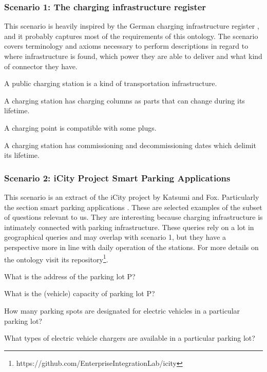 \subsubsection*{Scenario 1: The charging infrastructure register}

This scenario is heavily inspired by the German charging infrastructure
register \cite{Bundesnetzagentur.27Oct2023}, and it probably captures most of
the requirements of this ontology. The scenario covers terminology and axioms
necessary to perform descriptions in regard to where infrastructure is found,
which power they are able to deliver and what kind of connector they have.

\begin{namedbreak}
    A public charging station is a kind of transportation infrastructure.
\end{namedbreak}
\begin{namedbreak}\label{CQ1.1}
    A charging station has charging columns as parts that can change during its lifetime.
\end{namedbreak}
\begin{namedbreak}
    A charging point is compatible with some plugs.
\end{namedbreak}
\begin{namedbreak}
    A charging station has commissioning and decommissioning dates which delimit its lifetime.
\end{namedbreak}

\subsubsection*{Scenario 2: iCity Project Smart Parking Applications}

This scenario is an extract of the iCity project by Katsumi and Fox.
Particularly the section smart parking applications \cite{Katsumi.2020}. These
are selected examples of the subset of questions relevant to us. They are
interesting because charging infrastructure is intimately connected with
parking infrastructure. These queries rely on a lot in geographical queries and
may overlap with scenario 1, but they have a perspective more in line with
daily operation of the stations. For more details on the ontology visit its
repository\footnote{https://github.com/EnterpriseIntegrationLab/icity}.


\begin{namedbreak}\label{CQ2.0}
    What is the address of the parking lot P?
\end{namedbreak}
\begin{namedbreak}\label{CQ2.1}
    What is the (vehicle) capacity of parking lot P?
\end{namedbreak}
\begin{namedbreak}
    How many parking spots are designated for electric vehicles in a particular parking lot?
\end{namedbreak}
\begin{namedbreak}
    What types of electric vehicle chargers are available in a particular parking lot?
\end{namedbreak}
